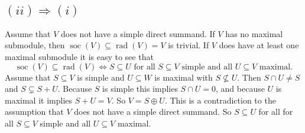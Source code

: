 \documentclass[a4paper,10pt]{article}
\theoremstyle{definition}
\newcommand{\soc}{\operatorname{soc}}
\newcommand{\rad}{\operatorname{rad}}
\begin{document}
\subsection*{$(ii) \Rightarrow (i)$}
Assume that $V$ does not have a simple direct summand. If $V$ has no maximal submodule, then $\soc(V) \subseteq \rad(V) = V$ is trivial.
If $V$ does have at least one maximal submodule it is easy to see that
\[
 \soc(V) \subseteq \rad(V) \Leftrightarrow S \subseteq U \text{ for all } S \subseteq V \text{ simple and all } U \subseteq V \text{ maximal}.
\]
Assume that $S \subseteq V$ is simple and $U \subseteq W$ is maximal with $S \nsubseteq U$. Then $S \cap U \neq S$ and $S \subsetneq S+U$. Because $S$ is simple this implies $S \cap U = 0$, and because $U$ is maximal it implies $S+U = V$. So $V = S \oplus U$. This is a contradiction to the assumption that $V$ does not have a simple direct summand. So $S \subseteq U$ for all for all $S \subseteq V$ simple and all $U \subseteq V$ maximal.





\section{}
\end{document}
